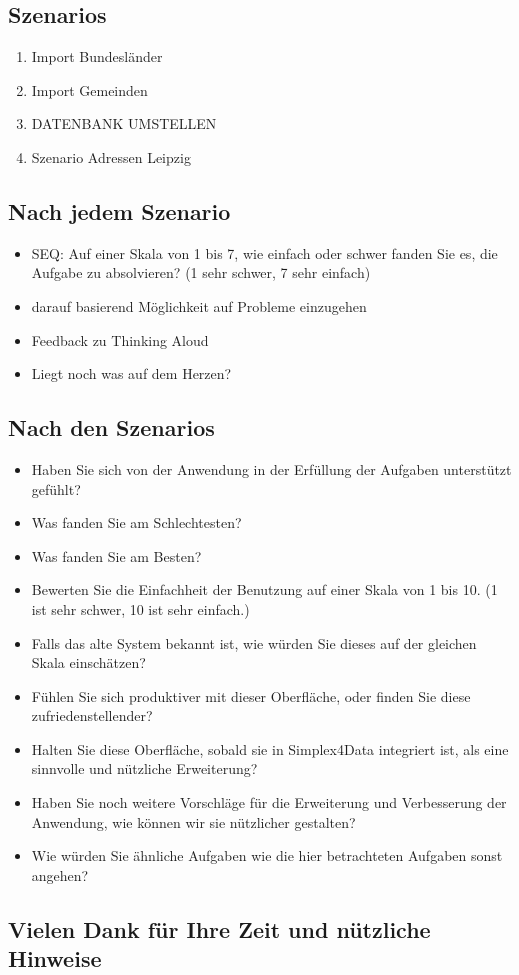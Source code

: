 \subsection*{Szenarios}
\begin{enumerate}
  \item Import Bundesländer
  \item Import Gemeinden
  \item[] DATENBANK UMSTELLEN
  \item Szenario Adressen Leipzig
\end{enumerate}

\subsection*{Nach jedem Szenario}
\begin{itemize}
  \item SEQ: Auf einer Skala von 1 bis 7, wie einfach oder schwer fanden Sie es, die Aufgabe zu
        absolvieren? (1 sehr schwer, 7 sehr einfach)
  \item darauf basierend Möglichkeit auf Probleme einzugehen
  \item Feedback zu Thinking Aloud
  \item Liegt noch was auf dem Herzen?
\end{itemize}

\subsection*{Nach den Szenarios}
\begin{itemize}
  \item Haben Sie sich von der Anwendung in der Erfüllung der Aufgaben unterstützt gefühlt?
  \item Was fanden Sie am Schlechtesten?
  \item Was fanden Sie am Besten?
  \item Bewerten Sie die Einfachheit der Benutzung auf einer Skala von 1 bis 10. (1 ist sehr schwer,
        10 ist sehr einfach.)
  \item Falls das alte System bekannt ist, wie würden Sie dieses auf der gleichen Skala einschätzen?
  \item Fühlen Sie sich produktiver mit dieser Oberfläche, oder finden Sie diese zufriedenstellender?
  \item Halten Sie diese Oberfläche, sobald sie in Simplex4Data integriert ist, als eine sinnvolle
        und nützliche Erweiterung?
  \item Haben Sie noch weitere Vorschläge für die Erweiterung und Verbesserung der Anwendung, wie
        können wir sie nützlicher gestalten?
  \item Wie würden Sie ähnliche Aufgaben wie die hier betrachteten Aufgaben sonst angehen?
\end{itemize}

\subsection*{Vielen Dank für Ihre Zeit und nützliche Hinweise}
